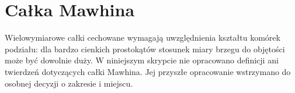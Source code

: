 \section{Całka Mawhina}
Wielowymiarowe całki cechowane wymagają uwzględnienia
kształtu komórek podziału: dla bardzo cienkich
prostokątów stosunek miary brzegu do objętości
może być dowolnie duży.
W niniejszym skrypcie nie opracowano definicji ani twierdzeń
dotyczących całki Mawhina. Jej przyszłe opracowanie
wstrzymano do osobnej decyzji o zakresie i miejscu.
